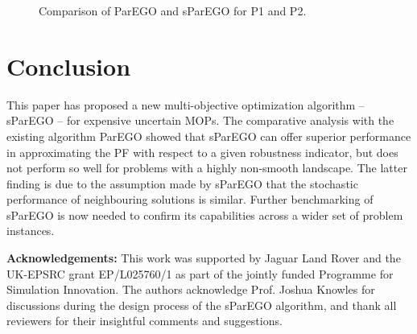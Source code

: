 \documentclass{llncs}
\begin{document}
\begin{figure}
{ \label{fig:P1_PF_comparison-b}
}
\hspace{1cm}
\caption{Comparison of ParEGO and sParEGO for P1 and P2.}
\label{fig:algorithms_comparison}
\end{figure}

\section{Conclusion}\label{sec:conclusion}

This paper has proposed a new multi-objective optimization algorithm -- sParEGO -- for expensive uncertain MOPs. The comparative analysis with the existing algorithm ParEGO showed that sParEGO can offer superior performance in approximating the PF with respect to a given robustness indicator, but does not perform so well for problems with a highly non-smooth landscape. The latter finding is due to the assumption made by sParEGO that the stochastic performance of neighbouring solutions is similar. Further benchmarking of sParEGO is now needed to confirm its capabilities across a wider set of problem instances.
\vspace{2mm}

\textbf{Acknowledgements: }This work was supported by Jaguar Land Rover and the UK-EPSRC grant EP/L025760/1 as part of the jointly funded Programme for Simulation Innovation. The authors acknowledge Prof. Joshua Knowles for discussions during the design process of the sParEGO algorithm, and thank all reviewers for their insightful comments and suggestions.

\small{


}
\end{document}
